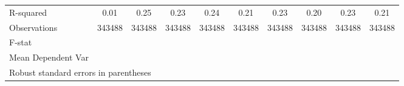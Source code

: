 {\begin{tabular}{l*{9}{c}}
\hline
R-squared           &        0.01         &        0.25         &        0.23         &        0.24         &        0.21         &        0.23         &        0.20         &        0.23         &        0.21         \\
Observations        &      343488         &      343488         &      343488         &      343488         &      343488         &      343488         &      343488         &      343488         &      343488         \\
F-stat              &                     &                     &                     &                     &                     &                     &                     &                     &                     \\
Mean Dependent Var  &                     &                     &                     &                     &                     &                     &                     &                     &                     \\
\hline\hline
\multicolumn{10}{l}{\footnotesize Robust standard errors in parentheses}\\
\end{tabular}
}
